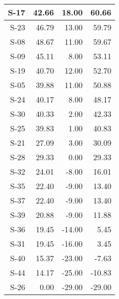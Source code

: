 \begin{tabular}{ | r | r | r | r | }
    \hline
                  S-17  &           42.66  &           18.00  &           60.66  \\
    \hline
                  S-23  &           46.79  &           13.00  &           59.79  \\
    \hline
                  S-08  &           48.67  &           11.00  &           59.67  \\
    \hline
                  S-09  &           45.11  &            8.00  &           53.11  \\
    \hline
                  S-19  &           40.70  &           12.00  &           52.70  \\
    \hline
                  S-05  &           39.88  &           11.00  &           50.88  \\
    \hline
                  S-24  &           40.17  &            8.00  &           48.17  \\
    \hline
                  S-30  &           40.33  &            2.00  &           42.33  \\
    \hline
                  S-25  &           39.83  &            1.00  &           40.83  \\
    \hline
                  S-21  &           27.09  &            3.00  &           30.09  \\
    \hline
                  S-28  &           29.33  &            0.00  &           29.33  \\
    \hline
                  S-32  &           24.01  &           -8.00  &           16.01  \\
    \hline
                  S-35  &           22.40  &           -9.00  &           13.40  \\
    \hline
                  S-37  &           22.40  &           -9.00  &           13.40  \\
    \hline
                  S-39  &           20.88  &           -9.00  &           11.88  \\
    \hline
                  S-36  &           19.45  &          -14.00  &            5.45  \\
    \hline
                  S-31  &           19.45  &          -16.00  &            3.45  \\
    \hline
                  S-40  &           15.37  &          -23.00  &           -7.63  \\
    \hline
                  S-44  &           14.17  &          -25.00  &          -10.83  \\
    \hline
                  S-26  &            0.00  &          -29.00  &          -29.00  \\

\end{tabular}
